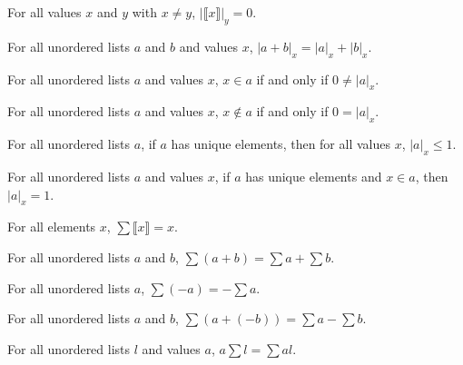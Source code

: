 \documentclass[../../math.tex]{subfiles}
\begin{document}
\begin{theorem}
    For all values $x$ and $y$ with $x \neq y$, $|\llbracket x\rrbracket|_y =
    0$.
\end{theorem}

\begin{theorem} \label{ulist_count_conc}
    For all unordered lists $a$ and $b$ and values $x$, $|a + b|_x = |a|_x +
    |b|_x$.
\end{theorem}

\begin{theorem} \label{ulist_count_in}
    For all unordered lists $a$ and values $x$, $x \in a$ if and only if $0 \neq
    |a|_x$.
\end{theorem}

\begin{theorem} \label{ulist_count_nin}
    For all unordered lists $a$ and values $x$, $x \notin a$ if and only if $0 =
    |a|_x$.
\end{theorem}

\begin{theorem} \label{ulist_count_unique}
    For all unordered lists $a$, if $a$ has unique elements, then for all values
    $x$, $|a|_x \leq 1$.
\end{theorem}

\begin{theorem} \label{ulist_count_in_unique}
    For all unordered lists $a$ and values $x$, if $a$ has unique elements and
    $x \in a$, then $|a|_x = 1$.
\end{theorem}

\begin{theorem}
    For all elements $x$, $\sum \llbracket x\rrbracket = x$.
\end{theorem}

\begin{theorem} \label{ulist_sum_conc}
    For all unordered lists $a$ and $b$, $\sum (a + b) = \sum a + \sum b$.
\end{theorem}

\begin{theorem} \label{ulist_sum_neg}
    For all unordered lists $a$, $\sum (-a) = -\sum a$.
\end{theorem}

\begin{theorem} \label{ulist_sum_minus}
    For all unordered lists $a$ and $b$, $\sum (a + (-b)) = \sum a - \sum b$.
\end{theorem}

\begin{theorem} \label{ulist_sum_lmult}
    For all unordered lists $l$ and values $a$, $a\sum l = \sum al$.
\end{theorem}
\end{document}
